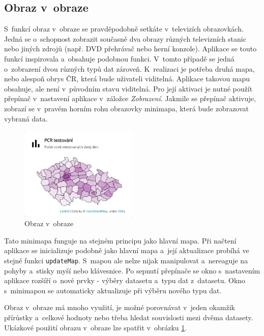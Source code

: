 \subsection{Obraz v~obraze}
\label{pip}

S~funkcí obraz v~obraze se pravděpodobně setkáte v~televizích obrazovkách. Jedná se o~schopnost zobrazit současně dva obrazy různých televizních stanic nebo jiných zdrojů (např. DVD přehrávač nebo herní konzole). Aplikace se touto funkcí inspirovala a~obsahuje podobnou funkci. V~tomto případě se jedná o~zobrazení dvou různých typů dat zároveň. K~realizaci je potřeba druhá mapa, nebo alespoň obrys ČR, která bude uživateli viditelná. Aplikace takovou mapu obsahuje, ale není v~původním stavu viditelná. Pro její aktivaci je nutné použít přepínač v~nastavení aplikace v~záložce \emph{Zobrazení}. Jakmile se přepínač aktivuje, zobrazí se v~pravém horním rohu obrazovky minimapa, která bude zobrazovat vybraná data.

\begin{figure}[h]
	\centering
	\includegraphics[width=0.5\textwidth]{Pictures/pip.png}
	\caption{Obraz v~obraze}
	\label{fig:PictureInPicture}
\end{figure}

Tato minimapa funguje na stejném principu jako hlavní mapa. Při načtení aplikace se inicializuje podobně jako hlavní mapa a~její aktualizace probíhá ve stejné funkci \lstinline{updateMap}. S~mapou ale nelze nijak manipulovat a~nereaguje na pohyby a~stisky myší nebo klávesnice. Po sepnutí přepínače se okno s~nastavením aplikace rozšíří o~nové prvky - výběry datasetu a~typu dat z~datasetu. Okno s~minimapou se automaticky aktualizuje při výběru nového typu dat.

Obraz v~obraze má mnoho využití, je možné porovnávat v~jeden okamžik přírůstky a~celkové hodnoty nebo třeba hledat souvislosti mezi dvěma datasety. Ukázkové použití obrazu v~obraze lze spatřit v~obrázku \ref{fig:PictureInPicture}.



